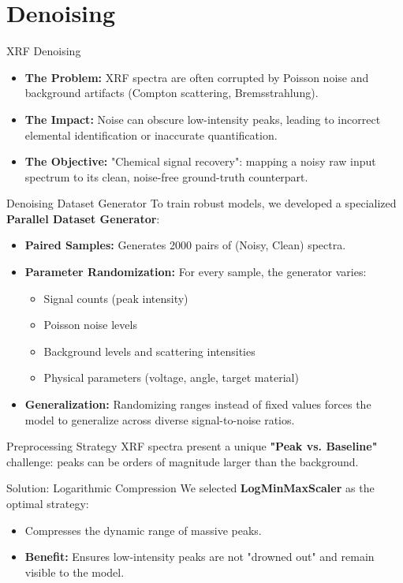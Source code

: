 \section{Denoising}

\begin{frame}{XRF Denoising}
    \begin{itemize}
        \item \textbf{The Problem:} XRF spectra are often corrupted by Poisson noise and background artifacts (Compton scattering, Bremsstrahlung).
        \item \textbf{The Impact:} Noise can obscure low-intensity peaks, leading to incorrect elemental identification or inaccurate quantification.
        \item \textbf{The Objective:} "Chemical signal recovery": mapping a noisy raw input spectrum to its clean, noise-free ground-truth counterpart.
    \end{itemize}
\end{frame}

\begin{frame}{Denoising Dataset Generator}
    To train robust models, we developed a specialized \textbf{Parallel Dataset Generator}:
    \begin{itemize}
        \item \textbf{Paired Samples:} Generates 2000 pairs of (Noisy, Clean) spectra.
        \item \textbf{Parameter Randomization:} For every sample, the generator varies:
        \begin{itemize}
            \item Signal counts (peak intensity)
            \item Poisson noise levels
            \item Background levels and scattering intensities
            \item Physical parameters (voltage, angle, target material)
        \end{itemize}
        \item \textbf{Generalization:} Randomizing ranges instead of fixed values forces the model to generalize across diverse signal-to-noise ratios.
    \end{itemize}
\end{frame}

\begin{frame}{Preprocessing Strategy}
    XRF spectra present a unique \textbf{"Peak vs. Baseline"} challenge: peaks can be orders of magnitude larger than the background.
    \vspace{0.3cm}
    \begin{block}{Solution: Logarithmic Compression}
        We selected \textbf{LogMinMaxScaler} as the optimal strategy:
        \begin{itemize}
            \item Compresses the dynamic range of massive peaks.
            \item \textbf{Benefit:} Ensures low-intensity peaks are not "drowned out" and remain visible to the model.
        \end{itemize}
    \end{block}
\end{frame}

